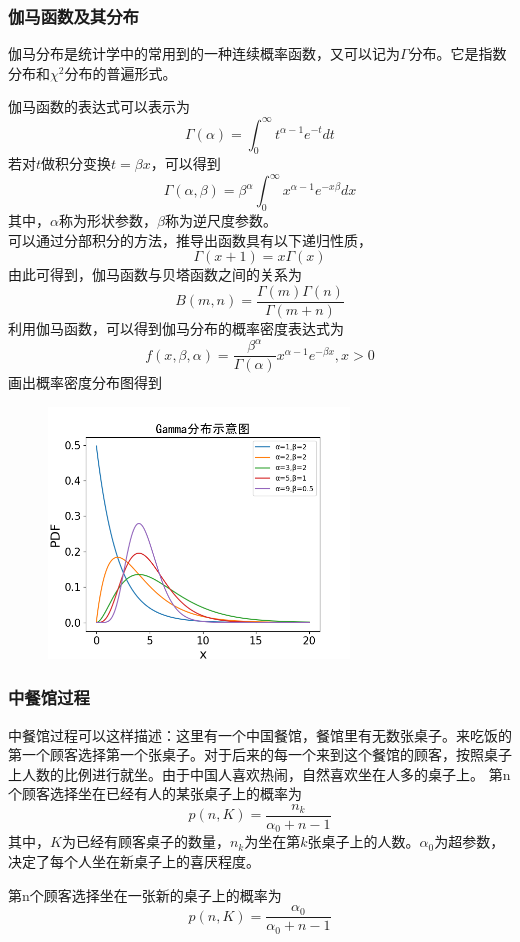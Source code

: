 \documentclass[a4paper,twoside]{article}
\theoremstyle{definition} \newtheorem{law}[thm]{Law}
\theoremstyle{plain} \newtheorem{jury}[thm]{Jury}
\theoremstyle{remark} \newtheorem*{marg}{Margaret}
\begin{document}
\subsubsection*{伽马函数及其分布}
伽马分布是统计学中的常用到的一种连续概率函数，又可以记为$\Gamma$分布。它是指数分布和$\chi^2$分布的普遍形式。

伽马函数的表达式可以表示为
$$\Gamma(\alpha)=\int_{0}^{\infty} t^{\alpha-1} e^{-t} d t
$$
若对$t$做积分变换$t=\beta x$，可以得到
$$
\Gamma(\alpha, \beta)=\beta^{\alpha} \int_{0}^{\infty} x^{\alpha-1} e^{-x \beta} d x
$$
其中，$\alpha$称为形状参数，$\beta$称为逆尺度参数。\\
可以通过分部积分的方法，推导出函数具有以下递归性质，
$$
\Gamma(x+1)=x \Gamma(x)
$$
由此可得到，伽马函数与贝塔函数之间的关系为
$$
B(m, n)=\frac{\Gamma(m) \Gamma(n)}{\Gamma(m+n)}
$$
利用伽马函数，可以得到伽马分布的概率密度表达式为
$$
f(x, \beta, \alpha)=\frac{\beta^{\alpha}}{\Gamma(\alpha)} x^{\alpha-1} e^{-\beta x}, x>0
$$
画出概率密度分布图得到
\begin{figure}
    \centering
    \includegraphics[width=8cm]{JLU_bachelor/appendix_fig/gamma.png}
    \label{fig:gamma}
\end{figure}

\subsubsection*{中餐馆过程}
中餐馆过程可以这样描述：这里有一个中国餐馆，餐馆里有无数张桌子。来吃饭的第一个顾客选择第一个张桌子。对于后来的每一个来到这个餐馆的顾客，按照桌子上人数的比例进行就坐。由于中国人喜欢热闹，自然喜欢坐在人多的桌子上。
第n个顾客选择坐在已经有人的某张桌子上的概率为
$$
p(n,K)=\frac{n_{k}}{\alpha_{0}+n-1}
$$
其中，$K$为已经有顾客桌子的数量，$n_k$为坐在第$k$张桌子上的人数。$\alpha_0$为超参数，决定了每个人坐在新桌子上的喜厌程度。

第n个顾客选择坐在一张新的桌子上的概率为
$$
p(n,K)=\frac{\alpha_{0}}{\alpha_{0}+n-1}
$$
\end{document}
